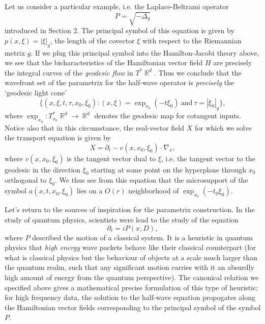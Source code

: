 \documentclass{article}
\theoremstyle{plain}
\theoremstyle{remark}
\theoremstyle{definition}
\DeclareMathOperator{\RR}{\mathbb{R}}
\begin{document}
Let us consider a particular example, i.e. the Laplace-Beltrami operator
%
\[ P = \sqrt{-\Delta_g} \]
%
introduced in Section 2. The principal symbol of this equation is given by $p(x,\xi) = |\xi|_g$, the length of the covector $\xi$ with respect to the Riemannian metrix $g$. If we plug this principal symbol into the Hamilton-Jacobi theory above, we see that the bicharacteristics of the Hamiltonian vector field $H$ are precisely the integral curves of the \emph{geodesic flow} in $T^* \RR^d$. Thus we conclude that the wavefront set of the parametrix for the half-wave operator is \emph{precisely} the `geodesic light cone'
%
\[ \Big\{ (x,\xi,t,\tau,x_0,\xi_0) : (x,\xi) = \exp_{x_0}(- t \xi_0)\ \text{and}\ \tau = |\xi_0|_g \Big\}, \]
%
where $\exp_{x_0}: T^*_{x_0} \RR^d \to \RR^d$ denotes the geodesic map for cotangent inputs. Notice also that in this circumstance, the real-vector field $X$ for which we solve the transport equation is given by
%
\[ X = \partial_t - v(x,x_0,\xi_0) \cdot \nabla_x, \]
%
where $v(x,x_0,\xi_0)$ is the tangent vector dual to $\xi$, i.e. the tangent vector to the geodesic in the direction $\xi_0$ starting at some point on the hyperplane through $x_0$ orthogonal to $\xi_0$. We thus see from this equation that the microsupport of the symbol $a(x,t,x_0,\xi_0)$ lies on a $O(r)$ neighborhood of $\exp_{x_0}(-t_0 \xi_0)$.

Let's return to the sources of inspiration for the parametrix construction. In the study of quantum physics, scientists were lead to the study of the equation
%
\[ \partial_t = i P(x,D), \]
%
where $P$ described the motion of a classical system. It is a heuristic in quantum physics that \emph{high energy} wave packets behave like their classical counterpart (for what is classical physics but the behaviour of objects at a scale much larger than the quantum realm, such that any significant motion carries with it an absurdly high amount of energy from the quantum perspective). The canonical relation we specified above gives a mathematical precise formulation of this type of heuristic; for high frequency data, the solution to the half-wave equation propogates along the Hamiltonian vector fields corresponding to the principal symbol of the symbol $P$.
\end{document}
